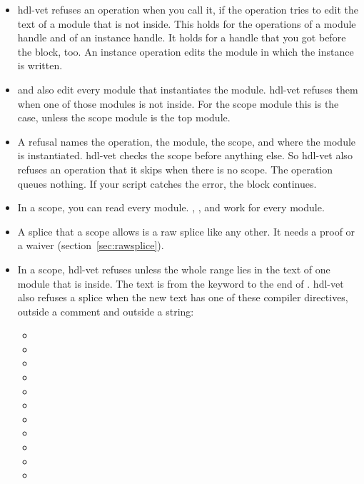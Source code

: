 \begin{itemize}
\item hdl-vet refuses an operation when you call it, if the operation tries to edit
  the text of a module that is not inside. This holds for the operations of a module
  handle and of an instance handle. It holds for a handle that you got before the
  block, too. An instance operation
  edits the module in which the instance is written.
\item {} and  also edit every
  module that instantiates the module. hdl-vet refuses them when one of those modules is
  not inside. For the scope module this is the case, unless the scope module is the top
  module.
\item A refusal names the operation, the module, the scope, and where the module is
  instantiated. hdl-vet checks the scope before anything else. So hdl-vet also refuses an
  operation that it skips when there is no scope. The operation queues nothing. If your script
  catches the error, the block continues.
\item In a scope, you can read every module. , ,
   and  work for every module.
\item A splice that a scope allows is a raw splice like any other. It needs a proof or a
  waiver (section~\ref{sec:rawsplice}).
\item In a scope, hdl-vet refuses  unless the whole range lies in
  the text of one module that is inside. The text is from the keyword  to
  the end of . hdl-vet also refuses a splice when the new text has one of
  these compiler directives, outside a comment and outside a string:
  \begin{itemize}
  \item {}
  \item {}
  \item {}
  \item {}
  \item {}
  \item {}
  \item {}
  \item {}
  \item {}
  \item {}
  \item {}

\end{itemize}
\end{itemize}
